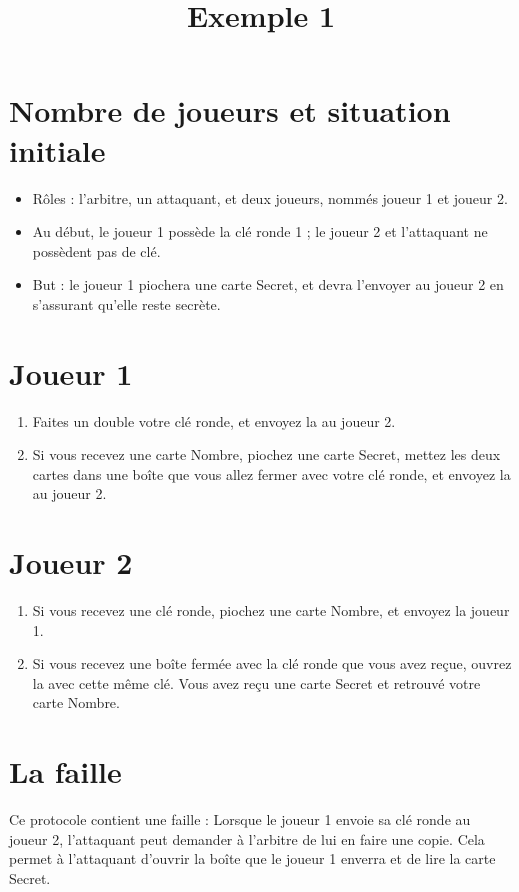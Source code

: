 \documentclass[a4paper,10pt]{article}
\title{Exemple 1}
\begin{document}
\maketitle

\section{Nombre de joueurs et situation initiale}
\begin{itemize}
	\item Rôles : l'arbitre, un attaquant, et deux joueurs, nommés joueur 1 et joueur 2.
	\item Au début, le joueur 1 possède la clé ronde 1 ; le joueur 2 et l'attaquant ne possèdent pas de clé.
	\item But : le joueur 1 piochera une carte Secret, et devra l'envoyer au joueur 2 en s'assurant qu'elle reste secrète.
\end{itemize}




\section{Joueur 1}
\begin{enumerate}
	\item Faites un double votre clé ronde, et envoyez la au joueur 2.
	\item Si vous recevez une carte Nombre, piochez une carte Secret, mettez les deux cartes dans une boîte que vous allez fermer avec votre clé ronde, et envoyez la au joueur 2.
\end{enumerate}

\section{Joueur 2}
\begin{enumerate}
	\item Si vous recevez une clé ronde, piochez une carte Nombre, et envoyez la joueur 1.
	\item Si vous recevez une boîte fermée avec la clé ronde que vous avez reçue, ouvrez la avec cette même clé. Vous avez reçu une carte Secret et retrouvé votre carte Nombre.
\end{enumerate}

\section{La faille}
Ce protocole contient une faille :
Lorsque le joueur 1 envoie sa clé ronde au joueur 2, l'attaquant peut demander à l'arbitre de lui en faire une copie. Cela permet à l'attaquant d'ouvrir la boîte que le joueur 1 enverra et de lire la carte Secret.
\end{document}
